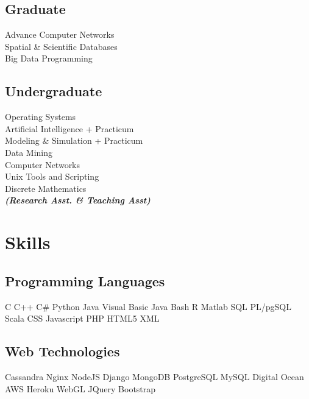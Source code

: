 \documentclass[]{deedy-resume-openfont}
\begin{document}
\begin{minipage}[t]{0.33\textwidth}
\subsection{Graduate}
Advance Computer Networks \\
Spatial \& Scientific Databases \\
Big Data Programming\\
\sectionsep
\subsection{Undergraduate}
Operating Systems \\
Artificial Intelligence + Practicum\\
Modeling \& Simulation + Practicum \\
Data Mining\\
Computer Networks\\
Unix Tools and Scripting \\
Discrete Mathematics\\
{\footnotesize \textit{\textbf{(Research Asst. \& Teaching Asst) }}} \\
\sectionsep


\section{Skills}
\subsection{Programming Languages}
C \textbullet{} C++ \textbullet{} C\# \textbullet{} Python \textbullet{} Java \textbullet{} Visual Basic \textbullet{} Java \textbullet{} Bash \textbullet{} R \textbullet{} Matlab \textbullet{} SQL \textbullet{} PL/pgSQL \textbullet{} Scala \textbullet{} CSS \textbullet{} Javascript \textbullet{} PHP \textbullet{} HTML5 \textbullet{} XML\\

\subsection{Web Technologies}
Cassandra \textbullet{} Nginx \textbullet{} NodeJS \textbullet{} Django \textbullet{} MongoDB \textbullet{} PostgreSQL \textbullet{}
MySQL \textbullet{} Digital Ocean \textbullet{} AWS \textbullet{} Heroku \textbullet{} WebGL \textbullet{} JQuery \textbullet{} Bootstrap\\


\end{minipage}
\end{document}
